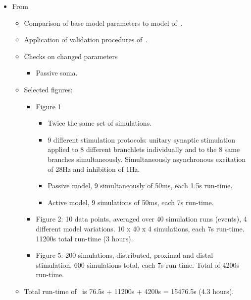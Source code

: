 \documentclass[12pt]{article}
\begin{document}
\begin{itemize}
\begin{itemize}
  \end{itemize}

\item From~\cite{schutter94:_simul_purkin}

  \begin{itemize}
  \item Comparison of base model parameters to model
    of~\cite{E:1994hc}.
  \item Application of validation procedures
    of~\cite{De-Schutter-E:1994vn}.
  \item Checks on changed parameters
    \begin{itemize}
    \item Passive soma.
    \end{itemize}
  \item Selected figures:
    \begin{itemize}
    \item Figure 1
      \begin{itemize}
      \item Twice the same set of simulations.
      \item 9 different stimulation protocols: unitary synaptic
        stimulation applied to 8 different branchlets individually and
        to the 8 same branches simultaneously.  Simultaneously
        asynchronous excitation of 28Hz and inhibition of 1Hz.
      \item Passive model, 9 simultaneously of 50ms, each 1.5s
        run-time.
      \item Active model, 9 simulations of 50ms, each 7s run-time.
      \end{itemize}
    \item Figure 2: 10 data points, averaged over 40 simulation runs
      (events), 4 different model variations.  10 x 40 x 4
      simulations, each 7s run-time.  11200s total run-time (3 hours).
    \item Figure 5: 200 simulations, distributed, proximal and distal
      stimulation.  600 simulations total, each 7s run-time.  Total of
      4200s run-time.
    \end{itemize}
  \item Total run-time of~\cite{schutter94:_simul_purkin} is 76.5s +
    11200s + 4200s = 15476.5s (4.3 hours).
  \end{itemize}


\end{itemize}
\end{document}
